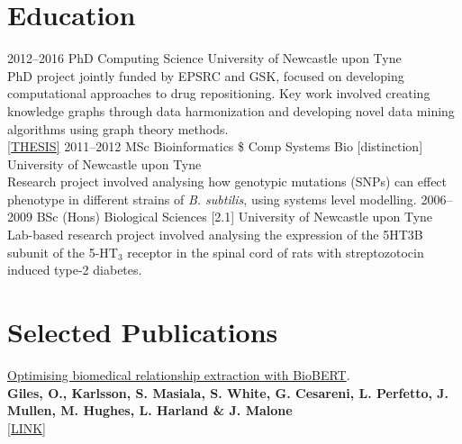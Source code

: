 \documentclass[print]{cv-style}          %
\begin{document}
\section{Education}
\begin{entrylist}
\entry
{2012--2016}
{PhD {\normalfont Computing Science}}
{University of Newcastle upon Tyne}
{\\
PhD project jointly funded by EPSRC and GSK, focused on developing computational approaches to drug repositioning. Key work involved creating knowledge graphs through data harmonization and developing novel data mining algorithms using graph theory methods.\\
\href{https://theses.ncl.ac.uk/jspui/handle/10443/3806}{[THESIS]}
}
\entry
{2011--2012}
{MSc {\normalfont Bioinformatics \$ Comp Systems Bio} [distinction]}
{University of Newcastle upon Tyne}
{ \\Research project involved analysing how genotypic mutations (SNPs) can effect phenotype in different strains of \emph{B. subtilis}, using systems level modelling.}
{\vspace{-0.3cm}}
\entry
{2006--2009}
{BSc (Hons) {\normalfont Biological Sciences} [2.1]}
{University of Newcastle upon Tyne}
{ \\ Lab-based research project involved analysing the expression of the 5HT3B subunit of the 5-HT$_3$ receptor in the spinal cord of rats with streptozotocin induced type-2 diabetes. }
{\vspace{-0.3cm}}
\end{entrylist}

\section{Selected Publications}

\underline{Optimising biomedical relationship extraction with BioBERT}.\\ 
    \textbf{Giles, O., Karlsson, S. Masiala, S. White, G. Cesareni, L. Perfetto, J. Mullen, M. Hughes, L. Harland \& J. Malone}\\
    {} \href{https://www.biorxiv.org/content/10.1101/2020.09.01.277277v1.abstract}{[LINK]}
\end{document}
